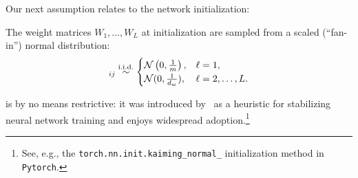 Our next assumption relates to the network initialization:
\begin{assumption}[Initialization]
	\label{assumption:initialization}
	The weight matrices $W_1, \dots, W_{L}$ at initialization are sampled from a scaled
	(``fan-in'') normal distribution:
	\begin{equation}
		[W_{\ell}(0)]_{ij} \iid \begin{cases}
			\cN\left(0, \frac{1}{\din}\right), & \ell = 1,           \\
			\cN(0, \frac{1}{\dhid}),           & \ell = 2, \dots, L.
		\end{cases}
		\label{eq:fan-in-initialization}
	\end{equation}
\end{assumption}
 is by no means restrictive: it
was introduced by~\cite{HZRS15} as a heuristic for stabilizing neural network training
and enjoys widespread adoption.\footnote{
	See, e.g., the \texttt{torch.nn.init.kaiming\_normal\_} initialization
	method in \texttt{Pytorch}.
}

